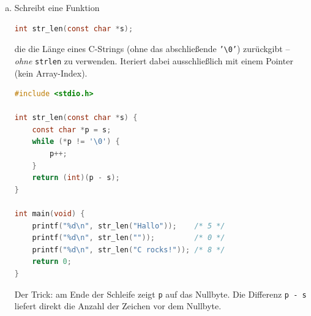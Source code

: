 \begin{enumerate}[a)]
\textbf{Hinweis:} Nutzt zwei Pointer (oder Indizes), die von beiden Enden des Arrays aufeinander zulaufen.

\begin{loesung}
\begin{lstlisting}[language=C]
#include <stdio.h>

void reverse(int *arr, int n) {
    int *left  = arr;
    int *right = arr + n - 1;
    int  tmp;

    while (left < right) {
        tmp    = *left;
        *left  = *right;
        *right = tmp;
        left++;
        right--;
    }
}

int main(void) {
    int a[] = {1, 2, 3, 4, 5};
    int i;

    reverse(a, 5);
    for (i = 0; i < 5; i++) {
        printf("%d ", a[i]);
    }
    printf("\n");   /* Ausgabe: 5 4 3 2 1 */
    return 0;
}
\end{lstlisting}
\end{loesung}

\item Schreibt eine Funktion

\begin{lstlisting}[language=C]
int str_len(const char *s);
\end{lstlisting}

die die Länge eines C-Strings (ohne das abschließende \texttt{'\textbackslash{}0'}) zurückgibt -- \emph{ohne} \texttt{strlen} zu verwenden.
Iteriert dabei ausschließlich mit einem Pointer (kein Array-Index).

\begin{loesung}
\begin{lstlisting}[language=C]
#include <stdio.h>

int str_len(const char *s) {
    const char *p = s;
    while (*p != '\0') {
        p++;
    }
    return (int)(p - s);
}

int main(void) {
    printf("%d\n", str_len("Hallo"));    /* 5 */
    printf("%d\n", str_len(""));         /* 0 */
    printf("%d\n", str_len("C rocks!")); /* 8 */
    return 0;
}
\end{lstlisting}

Der Trick: am Ende der Schleife zeigt \texttt{p} auf das Nullbyte.
Die Differenz \texttt{p - s} liefert direkt die Anzahl der Zeichen vor dem Nullbyte.
\end{loesung}

\end{enumerate}


